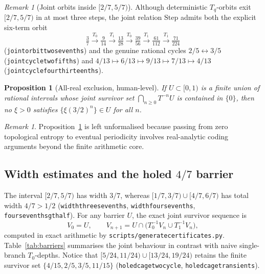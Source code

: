 \documentclass[11pt,a4paper]{article}
\newtheorem{proposition}[theorem]{Proposition}
\theoremstyle{remark}
\newtheorem{remark}[theorem]{Remark}
\renewcommand{\_}{\textunderscore\allowbreak}
\newcommand{\lean}[1]{\texttt{#1}}
\begin{document}
\begin{remark}[Joint orbits inside {$[2/7,5/7)$}]
\label{rem:joint}
Although deterministic $T_q$-orbits exit $[2/7,5/7)$ in at most three steps, the joint relation $\mathrm{Step}$ admits both the explicit six-term orbit
\[
  \tfrac37 \xrightarrow{T_0} \tfrac9{14} \xrightarrow{T_1} \tfrac{13}{28}
  \xrightarrow{T_0} \tfrac{39}{56} \xrightarrow{T_1} \tfrac{61}{112}
  \xrightarrow{T_1} \tfrac{71}{224}
\]
(\lean{joint\_orbit\_two\_sevenths}) and the genuine rational cycles $2/5\leftrightarrow 3/5$ (\lean{joint\_cycle\_two\_fifths}) and $4/13\mapsto 6/13\mapsto 9/13\mapsto 7/13\mapsto 4/13$ (\lean{joint\_cycle\_four\_thirteenths}).
\end{remark}

\begin{proposition}[All-real exclusion, human-level]
\label{prop:allreal}
If $U\subset[0,1)$ is a finite union of rational intervals whose joint survivor set $\bigcap_{n\ge0}T^{-n}U$ is contained in $\{0\}$, then no $\xi>0$ satisfies $\{\xi(3/2)^n\}\in U$ for all $n$.
\end{proposition}

\begin{remark}
Proposition~\ref{prop:allreal} is left unformalised because passing from zero topological entropy to eventual periodicity involves real-analytic coding arguments beyond the finite arithmetic core.
\end{remark}

\subsection{Width estimates and the holed \texorpdfstring{$4/7$}{4/7} barrier}
\label{sec:onset}

The interval $[2/7,5/7)$ has width $3/7$, whereas $[1/7,3/7)\cup[4/7,6/7)$ has total width $4/7>1/2$ (\lean{width\_three\_sevenths}, \lean{width\_four\_sevenths}, \lean{four\_sevenths\_gt\_half}). For any barrier $U$, the exact joint survivor sequence is
\[
  V_0=U, \qquad V_{n+1}=U\cap\bigl(T_0^{-1}V_n\cup T_1^{-1}V_n\bigr),
\]
computed in exact arithmetic by \lean{scripts/generate\_certificates.py}. Table~\ref{tab:barriers} summarises the joint behaviour in contrast with naive single-branch $T_0$-depths. Notice that $[5/24,11/24)\cup[13/24,19/24)$ retains the finite survivor set $\{4/15,2/5,3/5,11/15\}$ (\lean{holed\_cage\_two\_cycle}, \lean{holed\_cage\_transients}).
\end{document}
